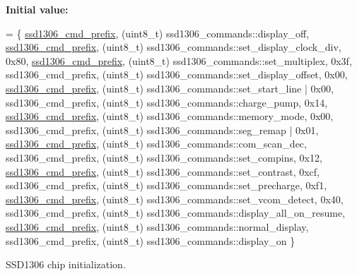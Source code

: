 {\bfseries Initial value\+:}
\begin{DoxyCode}
= \{
   \hyperlink{namespacehwlib_a91ba83b9f601b9e5a9d870a7355cd234}{ssd1306\_cmd\_prefix}, (uint8\_t) ssd1306\_commands::display\_off,                  
   \hyperlink{namespacehwlib_a91ba83b9f601b9e5a9d870a7355cd234}{ssd1306\_cmd\_prefix}, (uint8\_t) ssd1306\_commands::set\_display\_clock\_div, 0x80,
   \hyperlink{namespacehwlib_a91ba83b9f601b9e5a9d870a7355cd234}{ssd1306\_cmd\_prefix}, (uint8\_t) ssd1306\_commands::set\_multiplex,         0x3f,   
   ssd1306\_cmd\_prefix, (uint8\_t) ssd1306\_commands::set\_display\_offset,    0x00,   
   \hyperlink{namespacehwlib_a91ba83b9f601b9e5a9d870a7355cd234}{ssd1306\_cmd\_prefix}, (uint8\_t) ssd1306\_commands::set\_start\_line       | 0x00,  
   ssd1306\_cmd\_prefix, (uint8\_t) ssd1306\_commands::charge\_pump,           0x14,   
   \hyperlink{namespacehwlib_a91ba83b9f601b9e5a9d870a7355cd234}{ssd1306\_cmd\_prefix}, (uint8\_t) ssd1306\_commands::memory\_mode,           0x00,   
   ssd1306\_cmd\_prefix, (uint8\_t) ssd1306\_commands::seg\_remap            | 0x01,
   \hyperlink{namespacehwlib_a91ba83b9f601b9e5a9d870a7355cd234}{ssd1306\_cmd\_prefix}, (uint8\_t) ssd1306\_commands::com\_scan\_dec,
   ssd1306\_cmd\_prefix, (uint8\_t) ssd1306\_commands::set\_compins,           0x12,   
   \hyperlink{namespacehwlib_a91ba83b9f601b9e5a9d870a7355cd234}{ssd1306\_cmd\_prefix}, (uint8\_t) ssd1306\_commands::set\_contrast,          0xcf,   
   ssd1306\_cmd\_prefix, (uint8\_t) ssd1306\_commands::set\_precharge,         0xf1,  
   \hyperlink{namespacehwlib_a91ba83b9f601b9e5a9d870a7355cd234}{ssd1306\_cmd\_prefix}, (uint8\_t) ssd1306\_commands::set\_vcom\_detect,       0x40,   
   ssd1306\_cmd\_prefix, (uint8\_t) ssd1306\_commands::display\_all\_on\_resume,          
   \hyperlink{namespacehwlib_a91ba83b9f601b9e5a9d870a7355cd234}{ssd1306\_cmd\_prefix}, (uint8\_t) ssd1306\_commands::normal\_display,                
   ssd1306\_cmd\_prefix, (uint8\_t) ssd1306\_commands::display\_on                     
\}
\end{DoxyCode}


S\+S\+D1306 chip initialization. 

